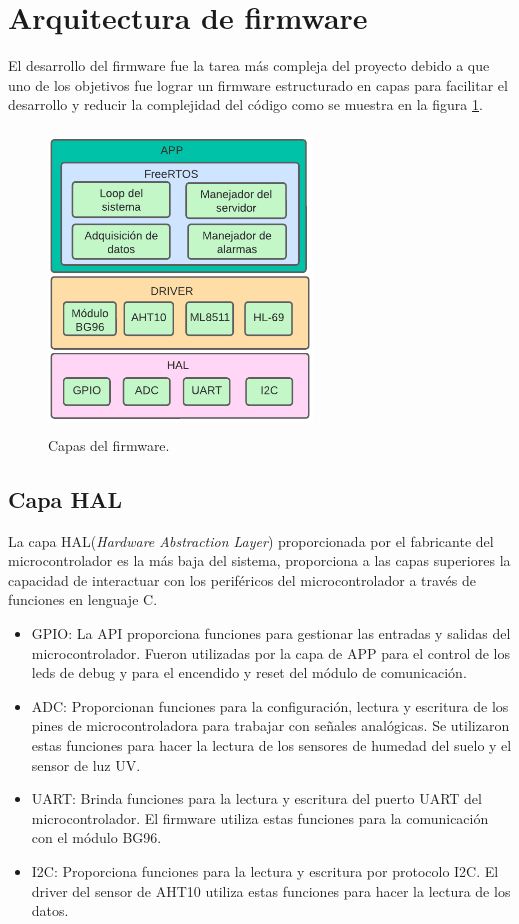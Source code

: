 \section{Arquitectura de firmware}
El desarrollo del firmware fue la tarea más compleja del proyecto debido a que uno de los objetivos fue lograr un firmware estructurado en capas para facilitar el desarrollo y reducir la complejidad del código como se muestra en la figura \ref{fig:Capas del firmware}.

\begin{figure}[h]
  \centering
	\includegraphics[width=7cm, height=8cm]{./Figures/Capas del firmware.png}
	\caption{Capas del firmware.}
	\label{fig:Capas del firmware}
\end{figure}

\subsection{Capa HAL} 
La capa HAL(\textit{Hardware Abstraction Layer}) proporcionada por el fabricante del microcontrolador  es la más baja del sistema, proporciona a las capas superiores la capacidad de interactuar con los periféricos del  microcontrolador a través de funciones en lenguaje C.
\begin{itemize}
  \item GPIO: La API proporciona funciones  para gestionar las entradas y salidas del microcontrolador. Fueron utilizadas por la capa de APP para el control de los leds de debug y para el encendido y reset del módulo de comunicación.
  \item ADC: Proporcionan funciones para la configuración, lectura y escritura de los pines de microcontroladora para trabajar con señales analógicas. Se utilizaron estas funciones para hacer la lectura de los sensores de humedad del suelo y el sensor de luz UV.
  \item UART: Brinda funciones para la lectura y escritura del puerto UART del microcontrolador. El firmware utiliza estas funciones para la comunicación con el módulo BG96.
  \item I2C: Proporciona funciones para la lectura y escritura por protocolo I2C. El driver del sensor de AHT10 utiliza estas funciones para hacer la lectura de los datos.
    
\end{itemize}

